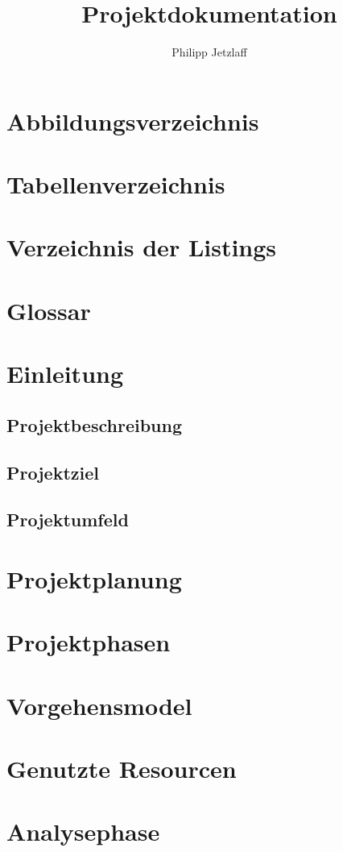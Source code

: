 \documentclass[12pt,a4paper,oneside]{article}
\author{Philipp Jetzlaff}
\title{Projektdokumentation}
\begin{document}
    \tableofcontents
    \newpage
    \section{Abbildungsverzeichnis}
    \newpage
    \section{Tabellenverzeichnis}
    \newpage
    \section{Verzeichnis der Listings}
    \newpage
    \section{Glossar}
    \newpage
    \section{Einleitung}
    \subsection{Projektbeschreibung}
    \subsection{Projektziel}
    \subsection{Projektumfeld}
    \section{Projektplanung}
    \section{Projektphasen}
    \section{Vorgehensmodel}
    \section{Genutzte Resourcen}
    \section{Analysephase}
\end{document}
